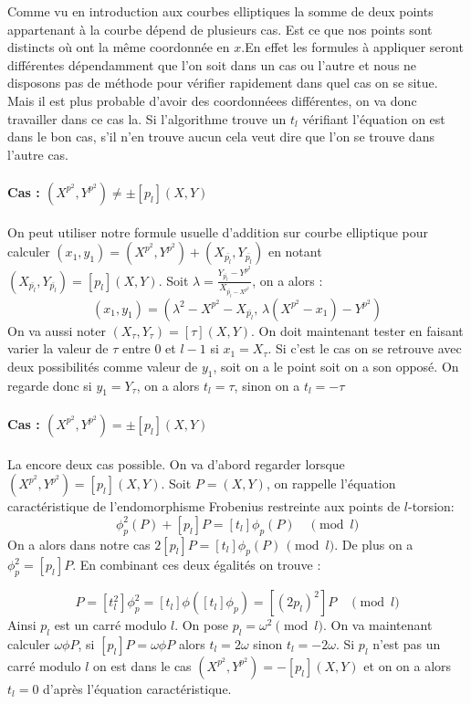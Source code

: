 \documentclass{article}
\begin{document}
Comme vu en introduction aux courbes elliptiques la somme de deux points appartenant à la courbe dépend de plusieurs cas. Est ce que nos points sont distincts où ont la même coordonnée en $x$.En effet les formules à appliquer seront différentes dépendamment que l'on soit dans un cas ou l'autre et nous ne disposons pas de méthode pour vérifier rapidement dans quel cas on se situe. Mais il est plus probable d'avoir des coordonnéees différentes, on va donc travailler dans ce cas la. Si l'algorithme trouve un $t_l$ vérifiant l'équation on est dans le bon cas, s'il n'en trouve aucun cela veut dire que l'on se trouve dans l'autre cas.
\paragraph*{Cas : $(X^{p^2}, Y^{p^2}) \ne \pm [p_l](X,Y)$}

On peut utiliser notre formule usuelle d'addition sur courbe elliptique pour calculer $(x_1, y_1) = (X^{p^2}, Y^{p^2}) + (X_{\bar{p_l}}, Y_{\bar{p_l}})$ en notant $(X_{\bar{p_l}}, Y_{\bar{p_l}}) =  [p_l](X,Y)$. 
\newline
Soit $\lambda = \frac{Y_{\bar{p_l}} - Y^{p^2}}{X_{\bar{p_l} - X^{p^2}}}$, on a alors :
\begin{equation}
(x_1, y_1) = (\lambda^2 - X^{p^2} - X_{\bar{p_l}}, \, \lambda (X^{p^2} - x_1) -  Y^{p^2})
\end{equation}
On va aussi noter $(X_{\tau}, Y_{\tau}) =  [\tau](X,Y)$. On doit maintenant tester en faisant varier la valeur de $\tau$ entre $0$ et $l -1$ si $x_1 = X_{\tau}$. Si c'est le cas on se retrouve avec deux possibilités comme valeur de $y_1$, soit on a le point soit on a son opposé. On regarde donc si $y_1 = Y_{\tau}$, on a alors $t_l = \tau$, sinon on a $t_l = - \tau$

\paragraph*{Cas : $(X^{p^2}, Y^{p^2}) = \pm [p_l](X,Y)$}
La encore deux cas possible. On va d'abord regarder lorsque $(X^{p^2}, Y^{p^2}) = [p_l](X,Y)$. 
\newline
Soit $P=(X,Y)$, on rappelle l’équation caractéristique de l'endomorphisme Frobenius restreinte aux points de $l$-torsion: 
\begin{equation}
\phi_p^2(P)  + [p_l]P = [t_{l}] \phi_p(P) \quad \pmod{l}
\end{equation}
On a alors dans notre cas $2[p_l]P = [t_{l}] \phi_p(P) \, \pmod{l}$. De plus on a $\phi_p^2 = [p_l]P$. En combinant ces deux égalités on trouve :

\begin{equation}
[t_l^2 p_l]P = [t_l^2] \phi_p^2 = [t_l] \phi ([t_l] \phi_p) = [(2p_l)^2]P \quad \pmod{l}
\end{equation}
Ainsi $p_l$ est un carré modulo $l$. On pose $p_l = \omega^2 \pmod{l}$. On va maintenant calculer $\omega \phi P$, si $[p_l]P = \omega \phi P$ alors $t_l = 2\omega$ sinon $t_l = -2\omega$.
\newline
\medskip
Si $p_l$ n'est pas un carré modulo $l$ on est dans le cas $(X^{p^2}, Y^{p^2}) = - [p_l](X,Y)$ et on on a alors $t_l = 0$ d'après l'équation caractéristique. 
\end{document}

